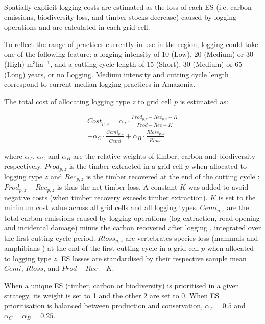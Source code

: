 \documentclass{article}
\begin{document}
Spatially-explicit logging costs are estimated as the loss of each ES (i.e. carbon emissions, biodiversity loss, and timber stocks decrease) caused by logging operations and are calculated in each grid cell.

To reflect the range of practices currently in use in the region, logging could take one of the following feature: a logging intensity of 10 (Low), 20 (Medium) or 30 (High) m$^3$ha$^{−1}$, and a cutting cycle length of 15 (Short), 30 (Medium) or 65 (Long) years, or no Logging. Medium intensity and cutting cycle length correspond to current median logging practices in Amazonia. 

The total cost of allocating logging type $z$ to grid cell $p$ is estimated as: 

\begin{equation}
\begin{split}
    Cost_{p,z} = \alpha _T \cdot \frac{Prod_{p,z} - Rec_{p,z} - K}{\overline{Prod - Rec - K}} \\+ \alpha _C \cdot \frac{Cemi_{p,z}}{\overline{Cemi} }  + \alpha _B \cdot \frac{Rloss_{p,z}}{\overline{Rloss}} 
\end{split}
\end{equation}

where $\alpha_T$, $\alpha_C$ and $\alpha_B$ are the relative weights of timber, carbon and biodiversity respectively. 
$Prod_{p,z}$ is the timber extracted in a grid cell $p$ when allocated to logging type $z$ and $Rec_{p,z}$ is the timber recovered at the end of the cutting cycle \cite{Piponiotc}: $Prod_{p,z} - Rec_{p,z}$ is thus the net timber loss. A constant $K$ was added to avoid negative costs (when timber recovery exceeds timber extraction). $K$ is set to the minimum cost value across all grid cells and all logging types. 
$Cemi_{p,z}$ are the total carbon emissions caused by logging operations (log extraction, road opening and incidental damage) minus the carbon recovered after logging \cite{Piponiot2016a}, integrated over the first cutting cycle period.
$Rloss_{p,z}$ are vertebrates species loss (mammals and amphibians \cite{Jenkins2013}) at the end of the first cutting cycle in a grid cell $p$ when allocated to logging type $z$. 
ES losses are standardised by their respective sample mean $\overline{Cemi}$, $\overline{Rloss}$, and $\overline{Prod-Rec-K}$. 

When a unique ES (timber, carbon or biodiversity) is prioritised in a given strategy, its weight is set to 1 and the other 2 are set to 0. When ES prioritisation is balanced between production and conservation, $\alpha_T = 0.5$ and $\alpha_C = \alpha_B = 0.25$.
\end{document}
